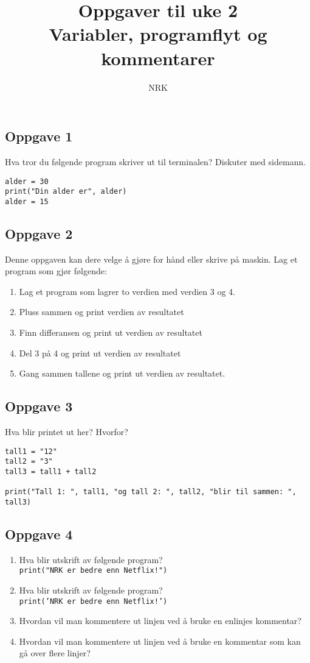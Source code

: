 \documentclass{article}
\title{Oppgaver til uke 2 \\ Variabler, programflyt og kommentarer}
\author{NRK}
\date{}
\begin{document}
\maketitle
\noindent
\subsection*{Oppgave 1}
Hva tror du følgende program skriver ut til terminalen? Diskuter med sidemann.

\begin{verbatim}
alder = 30
print("Din alder er", alder)
alder = 15
\end{verbatim} 


\subsection*{Oppgave 2}
Denne oppgaven kan dere velge å gjøre for hånd eller skrive på maskin. Lag et program som gjør følgende:
\begin{enumerate}
    \item Lag et program som lagrer to verdien med verdien 3 og 4.
    \item Pluss sammen og print verdien av resultatet
    \item Finn differansen og print ut verdien av resultatet
    \item Del 3 på 4 og print ut verdien av resultatet
    \item Gang sammen tallene og print ut verdien av resultatet.
\end{enumerate}

\subsection*{Oppgave 3}
Hva blir printet ut her? Hvorfor?
\begin{verbatim}
tall1 = "12"
tall2 = "3"
tall3 = tall1 + tall2
 
print("Tall 1: ", tall1, "og tall 2: ", tall2, "blir til sammen: ", tall3)
\end{verbatim}

\subsection*{Oppgave 4}
\begin{enumerate}
    \item Hva blir utskrift av følgende program? \\
    \texttt{print("NRK er bedre enn Netflix!")}
    \item Hva blir utskrift av følgende program? \\
    \texttt{print('NRK er bedre enn Netflix!')}
    \item Hvordan vil man kommentere ut linjen ved å bruke en enlinjes kommentar?
    \item Hvordan vil man kommentere ut linjen ved å bruke en kommentar som kan gå over flere linjer?
\end{enumerate}
\end{document}
